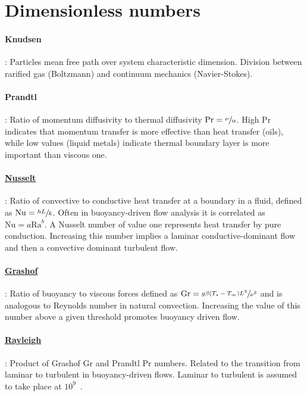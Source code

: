 \section{Dimensionless numbers}

\paragraph{Knudsen}: Particles mean free path over system characteristic dimension. Division between rarified gas (Boltzmann) and continuum mechanics (Navier-Stokes).

\paragraph{Prandtl}: Ratio of momentum diffusivity to thermal diffusivity $\mathrm{Pr}=\sfrac{\nu}{\alpha}$. High $\mathrm{Pr}$ indicates that momentum transfer is more effective than heat transfer (oils), while low values (liquid metals) indicate thermal boundary layer is more important than viscous one.

\paragraph{\href{https://en.wikipedia.org/wiki/Nusselt_number}{Nusselt}}: Ratio of convective to conductive heat transfer at a boundary in a fluid, defined as $\mathrm{Nu}=\sfrac{hL}{k}$. Often in buoyancy-driven flow analysis it is correlated as $\mathrm{Nu}=a\mathrm{Ra}^b$. A Nusselt number of value one represents heat transfer by pure conduction. Increasing this number implies a laminar conductive-dominant flow and then a convective dominant turbulent flow.

\paragraph{\href{https://en.wikipedia.org/wiki/Grashof_number}{Grashof}}: Ratio of buoyancy to viscous forces defined as $\mathrm{Gr}=\sfrac{g\beta(T_s-T_{\infty})L^3}{\nu^2}$ and is analogous to Reynolds number in natural convection. Increasing the value of this number above a given threshold promotes buoyancy driven flow. 

\paragraph{\href{https://en.wikipedia.org/wiki/Rayleigh_number}{Rayleigh}}: Product of Grashof $\mathrm{Gr}$ and Prandtl $\mathrm{Pr}$ numbers. Related to the transition from laminar to turbulent in buoyancy-driven flows. Laminar to turbulent is assumed to take place at $10^9$~\citep{2014Balaji}.

\endinput